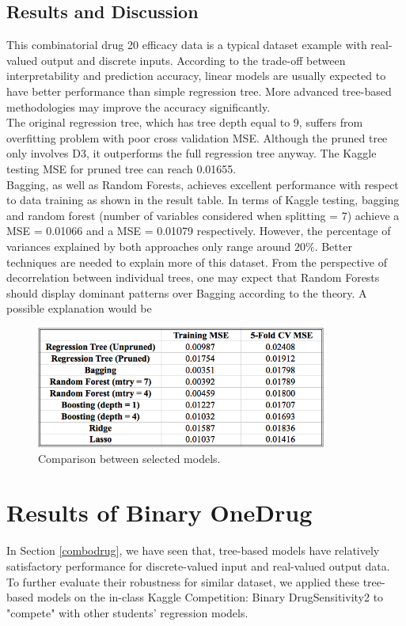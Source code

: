 \documentclass{article}
\begin{document}
\subsection{Results and Discussion}
This combinatorial drug 20 efficacy data is a typical dataset example with real-valued output and discrete inputs. According to the trade-off between interpretability and prediction accuracy,  linear models are usually expected to have better performance than simple regression tree. More advanced tree-based methodologies may improve the accuracy significantly.\\

The original regression tree, which has tree depth equal to 9, suffers from overfitting problem with poor cross validation MSE. Although the pruned tree only involves D3, it outperforms the full regression tree anyway. The Kaggle testing MSE for pruned tree can reach 0.01655.\\

Bagging, as well as Random Forests, achieves excellent performance with respect to data training as shown in the result table. In terms of Kaggle testing, bagging and random forest (number of variables considered when splitting = 7) achieve a MSE = 0.01066 and a MSE = 0.01079 respectively. However, the percentage of variances explained by both approaches only range around $20\%$. Better techniques are needed to explain more of this dataset. From the perspective of decorrelation between individual trees, one may expect that Random Forests should display dominant patterns over Bagging according to the theory. A possible explanation would be 

\begin{figure}[h]
  \centering
  \includegraphics[height = 4cm]{combo_result}
  \caption{Comparison between selected models.}
\end{figure}


\newpage
\section{Results of Binary OneDrug}
\label{drug2}
In Section \ref{combodrug}, we have seen that, tree-based models have relatively satisfactory performance for discrete-valued input and real-valued output data. To further evaluate their robustness for similar dataset, we applied these tree-based models on the in-class Kaggle Competition: Binary DrugSensitivity2 to "compete" with other students' regression models.\\
\end{document}
